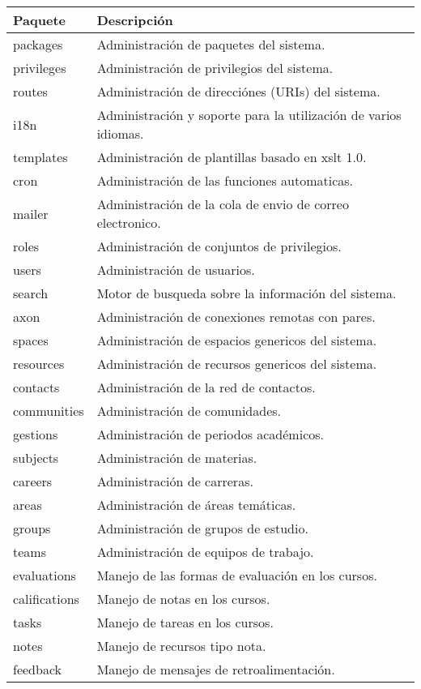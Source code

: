 \begin{table}
\begin{tabular}{l|l}
Paquete & Descripción \\
\hline
packages & Administración de paquetes del sistema. \\
privileges & Administración de privilegios del sistema. \\
routes & Administración de direcciónes (URIs) del sistema. \\
i18n & Administración y soporte para la utilización de varios idiomas. \\
templates & Administración de plantillas basado en xslt 1.0. \\
\hline
cron & Administración de las funciones automaticas. \\
mailer & Administración de la cola de envio de correo electronico. \\
roles & Administración de conjuntos de privilegios. \\
users & Administración de usuarios. \\
search & Motor de busqueda sobre la información del sistema. \\
axon & Administración de conexiones remotas con pares. \\
spaces & Administración de espacios genericos del sistema. \\
resources & Administración de recursos genericos del sistema. \\
\hline
contacts & Administración de la red de contactos. \\
communities & Administración de comunidades. \\
gestions & Administración de periodos académicos. \\
subjects & Administración de materias. \\
careers & Administración de carreras. \\
areas & Administración de áreas temáticas. \\
groups & Administración de grupos de estudio. \\
teams & Administración de equipos de trabajo. \\
evaluations & Manejo de las formas de evaluación en los cursos. \\
califications & Manejo de notas en los cursos. \\
tasks & Manejo de tareas en los cursos. \\
notes & Manejo de recursos tipo nota. \\
feedback & Manejo de mensajes de retroalimentación. \\

\end{tabular}
\end{table}
